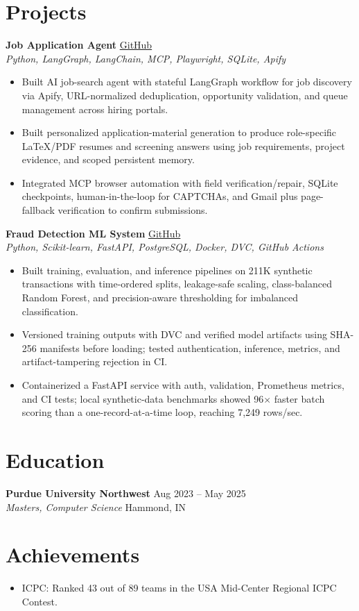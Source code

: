 \documentclass[10pt, letterpaper]{article}
\begin{document}
\section{Projects}
\textbf{Job Application Agent} \hfill \href{https://github.com/Jaswanth19-596/Autonomous_Multi_Agent_Job_Application_System}{GitHub} \\
\textit{Python, LangGraph, LangChain, MCP, Playwright, SQLite, Apify}
\begin{itemize}
    \item Built AI job-search agent with stateful LangGraph workflow for job discovery via Apify, URL-normalized deduplication, opportunity validation, and queue management across hiring portals.
    \item Built personalized application-material generation to produce role-specific LaTeX/PDF resumes and screening answers using job requirements, project evidence, and scoped persistent memory.
    \item Integrated MCP browser automation with field verification/repair, SQLite checkpoints, human-in-the-loop for CAPTCHAs, and Gmail plus page-fallback verification to confirm submissions.
\end{itemize}

\textbf{Fraud Detection ML System} \hfill \href{https://github.com/Jaswanth19-596/fraud-detection-mlsystem}{GitHub} \\
\textit{Python, Scikit-learn, FastAPI, PostgreSQL, Docker, DVC, GitHub Actions}
\begin{itemize}
    \item Built training, evaluation, and inference pipelines on 211K synthetic transactions with time-ordered splits, leakage-safe scaling, class-balanced Random Forest, and precision-aware thresholding for imbalanced classification.
    \item Versioned training outputs with DVC and verified model artifacts using SHA-256 manifests before loading; tested authentication, inference, metrics, and artifact-tampering rejection in CI.
    \item Containerized a FastAPI service with auth, validation, Prometheus metrics, and CI tests; local synthetic-data benchmarks showed 96$\times$ faster batch scoring than a one-record-at-a-time loop, reaching 7,249 rows/sec.
\end{itemize}

\section{Education}
\textbf{Purdue University Northwest} \hfill Aug 2023 -- May 2025 \\
\textit{Masters, Computer Science} \hfill Hammond, IN

\section{Achievements}
\begin{itemize}
    \item ICPC: Ranked 43 out of 89 teams in the USA Mid-Center Regional ICPC Contest.
\end{itemize}
\end{document}
